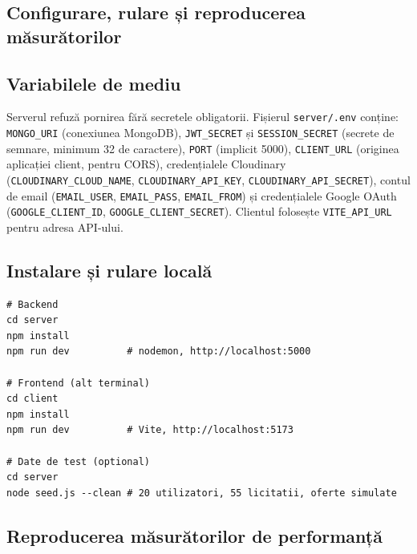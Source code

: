 \begin{appendices}


\chapter{Configurare, rulare și reproducerea măsurătorilor}
\label{anexa:rulare}

\section{Variabilele de mediu}

Serverul refuză pornirea fără secretele obligatorii. Fișierul \texttt{server/.env} conține: \texttt{MONGO\_URI} (conexiunea MongoDB), \texttt{JWT\_SECRET} și \texttt{SESSION\_SECRET} (secrete de semnare, minimum 32 de caractere), \texttt{PORT} (implicit 5000), \texttt{CLIENT\_URL} (originea aplicației client, pentru CORS), credențialele Cloudinary (\texttt{CLOUDINARY\_CLOUD\_NAME}, \texttt{CLOUDINARY\_API\_KEY}, \texttt{CLOUDINARY\_API\_SECRET}), contul de email (\texttt{EMAIL\_USER}, \texttt{EMAIL\_PASS}, \texttt{EMAIL\_FROM}) și credențialele Google OAuth (\texttt{GOOGLE\_CLIENT\_ID}, \texttt{GOOGLE\_CLIENT\_SECRET}). Clientul folosește \texttt{VITE\_API\_URL} pentru adresa API-ului.

\section{Instalare și rulare locală}

\begin{verbatim}
# Backend
cd server
npm install
npm run dev          # nodemon, http://localhost:5000

# Frontend (alt terminal)
cd client
npm install
npm run dev          # Vite, http://localhost:5173

# Date de test (optional)
cd server
node seed.js --clean # 20 utilizatori, 55 licitatii, oferte simulate
\end{verbatim}

\section{Reproducerea măsurătorilor de performanță}


\end{appendices}
